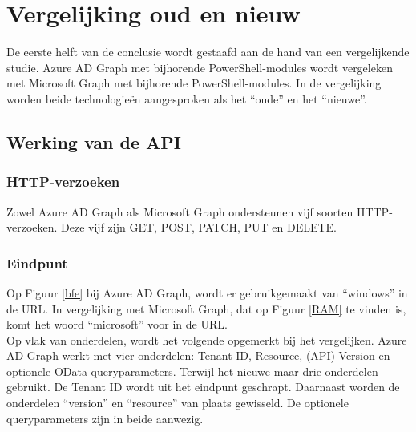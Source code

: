
\chapter{Vergelijking oud en nieuw}%
\label{ch:vergelijking}


De eerste helft van de conclusie wordt gestaafd aan de hand van een vergelijkende studie. Azure \ac{AD} Graph met bijhorende PowerShell-modules wordt vergeleken met Microsoft Graph met bijhorende PowerShell-modules. In de vergelijking worden beide technologieën aangesproken als het “oude” en het “nieuwe”. 

\section{Werking van de API}


  

\subsection{HTTP-verzoeken}


Zowel Azure \ac{AD} Graph als Microsoft Graph ondersteunen vijf soorten \ac{HTTP}-verzoeken. Deze vijf zijn GET, POST, PATCH, PUT en DELETE. 

\subsection{Eindpunt}


Op Figuur \ref{bfe} bij Azure \ac{AD} Graph, wordt er gebruikgemaakt van “windows” in de \ac{URL}. In vergelijking met Microsoft Graph, dat op Figuur \ref{RAM} te vinden is, komt het woord “microsoft” voor in de \ac{URL}. \\

Op vlak van onderdelen, wordt het volgende opgemerkt bij het vergelijken. Azure \ac{AD} Graph werkt met vier onderdelen: Tenant ID, Resource, (\ac{API}) Version en optionele OData-queryparameters. Terwijl het nieuwe maar drie onderdelen gebruikt. De Tenant ID wordt uit het eindpunt geschrapt. Daarnaast worden de onderdelen “version” en “resource” van plaats gewisseld. De optionele queryparameters zijn in beide aanwezig. 




